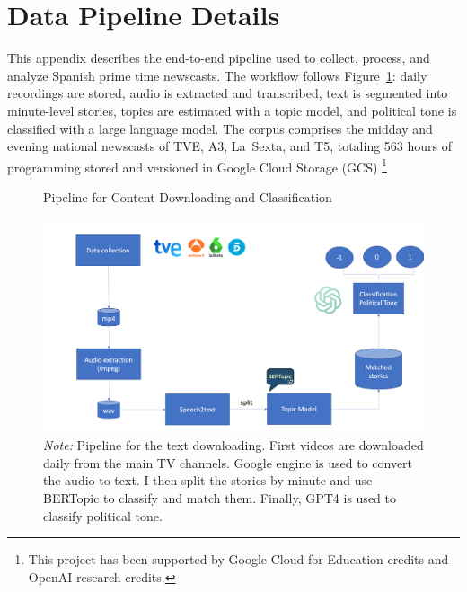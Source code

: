 \documentclass[12pt]{article}
\begin{document}
	\parttoc %
	
	
	\renewcommand\thefigure{\thesection.\arabic{figure}}   
	\renewcommand\thetable{\thesection.\arabic{table}}
	\setcounter{table}{0}
	
	
	\clearpage
	
	
	
	
	
	
	\section{Data Pipeline  Details}\label{sec:appendix_models}
	
	
	
	This appendix describes the end-to-end pipeline used to collect, process, and analyze Spanish prime time newscasts. The workflow follows  Figure~\ref{fig:pipeline}: daily recordings are stored, audio is extracted and transcribed, text is segmented into minute-level stories, topics are estimated with a topic model, and political tone is classified with a large language model. The corpus comprises the midday and evening national newscasts of TVE, A3, La~Sexta, and T5, totaling {563 hours} of programming stored and versioned in Google Cloud Storage (GCS) \footnote{This project has been supported by Google Cloud for Education credits and OpenAI research credits.} %






\begin{figure}[!htb]
	\centering
	\caption{Pipeline for Content Downloading and Classification }
	\includegraphics[width=150mm]{figures/pipeline3}
	\caption*{\small \textit{Note:} Pipeline for the text downloading. First videos are downloaded daily from the main TV channels. Google engine is used to convert the audio to text. I then split the stories by minute and use BERTopic to classify and match them. Finally, GPT4 is used to classify political tone.}
	\label{fig:pipeline}
\end{figure}
\end{document}
